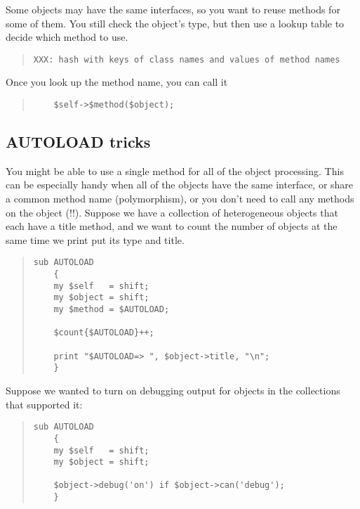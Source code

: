 Some objects may have the same interfaces, so you want to
reuse methods for some of them.  You still check the
object's type, but then use a lookup table to decide which
method to use.

\begin{quote}    
\begin{verbatim}
XXX: hash with keys of class names and values of method names
\end{verbatim}
\end{quote}    

Once you look up the method name, you can call it

\begin{quote}    
\begin{verbatim}
	$self->$method($object);
\end{verbatim}
\end{quote}    
	
	\subsection{AUTOLOAD tricks}
	
You might be able to use a single method for all of the
object processing. This can be especially handy when all of
the objects have the same interface, or share a common
method name (polymorphism), or you don't need to call any
methods on the object (!!).  Suppose we have a collection of
heterogeneous objects that each have a title method, and we
want to count the number of objects at the same time we
print put its type and title.

\begin{quote}    
\begin{verbatim}
sub AUTOLOAD
	{
	my $self   = shift;
	my $object = shift;
	my $method = $AUTOLOAD;
	
	$count{$AUTOLOAD}++;
	
	print "$AUTOLOAD=> ", $object->title, "\n";
	}
\end{verbatim}
\end{quote}    
		
Suppose we wanted to turn on debugging output for objects in
the collections that supported it:

\begin{quote}    
\begin{verbatim}
sub AUTOLOAD
	{
	my $self   = shift;
	my $object = shift;

	$object->debug('on') if $object->can('debug');
	}
\end{verbatim}
\end{quote}    

